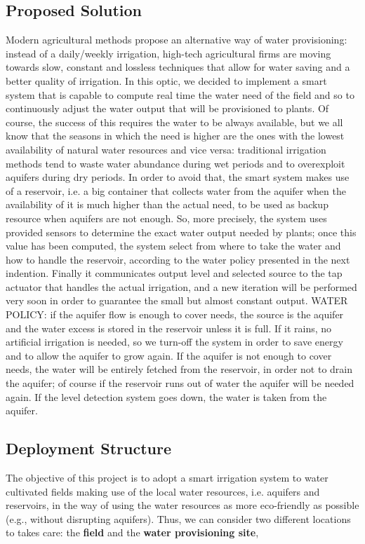 \subsection{Proposed Solution}
Modern agricultural methods propose an alternative way of water provisioning: instead of a daily/weekly irrigation, high-tech agricultural firms are moving towards slow, constant and lossless techniques that allow for water saving and a better quality of irrigation. In this optic, we decided to implement a smart system that is capable to compute real time the water need of the field and so to continuously adjust the water output that will be provisioned to plants. 
Of course, the success of this requires the water to be always available, but we all know that the seasons in which the need is higher are the ones with the lowest availability of natural water resources and vice versa: traditional irrigation methods tend to waste water abundance during wet periods and to overexploit aquifers during dry periods. 
In order to avoid that, the smart system makes use of a reservoir, i.e. a big container that collects water from the aquifer when the availability of it is much higher than the actual need, to be used as backup resource when aquifers are not enough. 
So, more precisely, the system uses provided sensors to determine the exact water output needed by plants; once this value has been computed, the system select from where to take the water and how to handle the reservoir, according to the water policy presented in the next indention. Finally it communicates output level and selected source to the tap actuator that handles the actual irrigation, and a new iteration will be performed very soon in order to guarantee the small but almost constant output.
WATER POLICY: if the aquifer flow is enough to cover needs, the source is the aquifer and the water excess is stored in the reservoir unless it is full. If it rains, no artificial irrigation is needed, so we turn-off the system in order to save energy and to allow the aquifer to grow again. If the aquifer is not enough to cover needs, the water will be entirely fetched from the reservoir, in order not to drain the aquifer; of course if the reservoir runs out of water the aquifer will be needed again. If the level detection system goes down, the water is taken from the aquifer.

\subsection{Deployment Structure}
The objective of this project is to adopt a smart irrigation system to water cultivated fields making use of the local water resources, i.e. aquifers and reservoirs, in the way of using the water resources as more eco-friendly as possible (e.g., without disrupting aquifers). Thus, we can consider two different locations to takes care: the \textbf{field} and the \textbf{water provisioning site},


